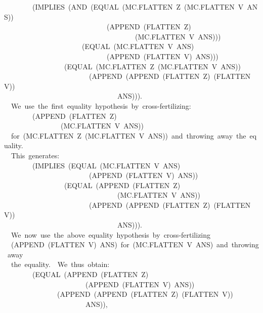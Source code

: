 \documentclass[11pt]{book}
\newenvironment{pubasis}{\begin{flushleft}\ttfamily\small}{\normalsize\rmfamily\end{flushleft}}
\begin{document}
\begin{pubasis}
~~~~~~~~(IMPLIES~(AND~(EQUAL~(MC.FLAT\-TEN~Z~(MC.FLAT\-TEN~V~ANS))\\
~~~~~~~~~~~~~~~~~~~~~~~~~~~~~(APPEND~(FLATTEN~Z)\\
~~~~~~~~~~~~~~~~~~~~~~~~~~~~~~~~~~~~~(MC.FLAT\-TEN~V~ANS)))\\
~~~~~~~~~~~~~~~~~~~~~~(EQUAL~(MC.FLAT\-TEN~V~ANS)\\
~~~~~~~~~~~~~~~~~~~~~~~~~~~~~(APPEND~(FLATTEN~V)~ANS)))\\
~~~~~~~~~~~~~~~~~(EQUAL~(MC.FLAT\-TEN~Z~(MC.FLAT\-TEN~V~ANS))\\
~~~~~~~~~~~~~~~~~~~~~~~~(APPEND~(APPEND~(FLATTEN~Z)~(FLATTEN~V))\\
~~~~~~~~~~~~~~~~~~~~~~~~~~~~~~~~ANS))).\\

~~We~use~the~first~equality~hypothesis~by~cross-fertilizing:\\
~~~~~~~~(APPEND~(FLATTEN~Z)\\
~~~~~~~~~~~~~~~~(MC.FLAT\-TEN~V~ANS))\\
~~for~(MC.FLAT\-TEN~Z~(MC.FLAT\-TEN~V~ANS))~and~throwing~away~the~equality.\\
~~This~generates:\\

~~~~~~~~(IMPLIES~(EQUAL~(MC.FLAT\-TEN~V~ANS)\\
~~~~~~~~~~~~~~~~~~~~~~~~(APPEND~(FLATTEN~V)~ANS))\\
~~~~~~~~~~~~~~~~~(EQUAL~(APPEND~(FLATTEN~Z)\\
~~~~~~~~~~~~~~~~~~~~~~~~~~~~~~~~(MC.FLAT\-TEN~V~ANS))\\
~~~~~~~~~~~~~~~~~~~~~~~~(APPEND~(APPEND~(FLATTEN~Z)~(FLATTEN~V))\\
~~~~~~~~~~~~~~~~~~~~~~~~~~~~~~~~ANS))).\\

~~We~now~use~the~above~equality~hypothesis~by~cross-fertilizing\\
~~(APPEND~(FLAT\-TEN~V)~ANS)~for~(MC.FLAT\-TEN~V~ANS)~and~throwing~away\\
~~the~equality.~~We~thus~obtain:\\

~~~~~~~~(EQUAL~(APPEND~(FLATTEN~Z)\\
~~~~~~~~~~~~~~~~~~~~~~~(APPEND~(FLATTEN~V)~ANS))\\
~~~~~~~~~~~~~~~(APPEND~(APPEND~(FLATTEN~Z)~(FLATTEN~V))\\
~~~~~~~~~~~~~~~~~~~~~~~ANS)),\\


\end{pubasis}
\end{document}
